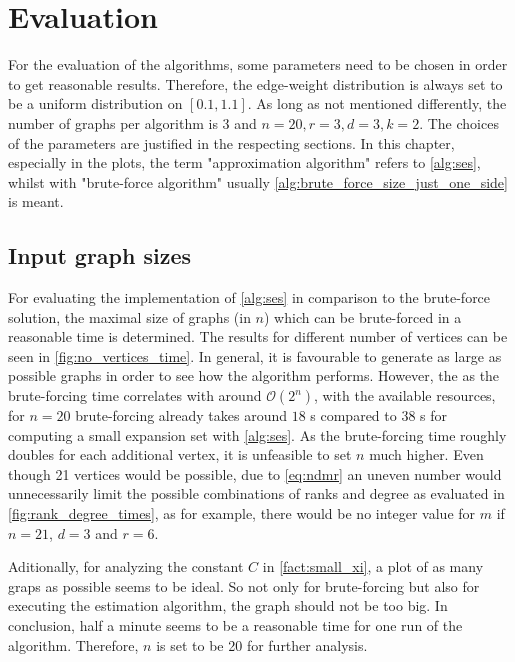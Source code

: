 \chapter{Evaluation}\label{chapter:Evaluation}
For the evaluation of the algorithms, some parameters need to be chosen in order to get reasonable results. Therefore, the edge-weight distribution is always set to be a uniform distribution on $[0.1, 1.1]$. As long as not mentioned differently, the number of graphs per algorithm is 3 and $n = 20, r = 3, d = 3, k = 2$. The choices of the parameters are justified in the respecting sections. In this chapter, especially in the plots, the term "approximation algorithm" refers to \cref{alg:ses}, whilst with "brute-force algorithm" usually \cref{alg:brute_force_size_just_one_side} is meant.



\section{Input graph sizes}
For evaluating the implementation of \cref{alg:ses} in comparison to the brute-force solution, the maximal size of graphs (in $n$) which can be brute-forced in a reasonable time is determined. The results for different number of vertices can be seen in \cref{fig:no_vertices_time}. In general, it is favourable to generate as large as possible graphs in order to see how the algorithm performs.
However, the as the brute-forcing time correlates with around $ \mathcal{O}(2^n)$, with the available resources, for $n=20$ brute-forcing already takes around $18$ s compared to $38$ s for computing a small expansion set with \cref{alg:ses}. As the brute-forcing time roughly doubles for each additional vertex, it is unfeasible to set $n$ much higher. Even though 21 vertices would be possible, due to \cref{eq:ndmr} an uneven number would unnecessarily limit the possible combinations of ranks and degree as evaluated in \cref{fig:rank_degree_times}, as for example, there would be no integer value for $m$ if $n = 21$, $d= 3$ and $r = 6$.

Aditionally, for analyzing the constant $C$ in \cref{fact:small_xi}, a plot of as many graps as possible seems to be ideal. So not only for brute-forcing but also for executing the estimation algorithm, the graph should not be too big. In conclusion, half a minute seems to be a reasonable time for one run of the algorithm. %
Therefore, $n$ is set to be 20 for further analysis.

